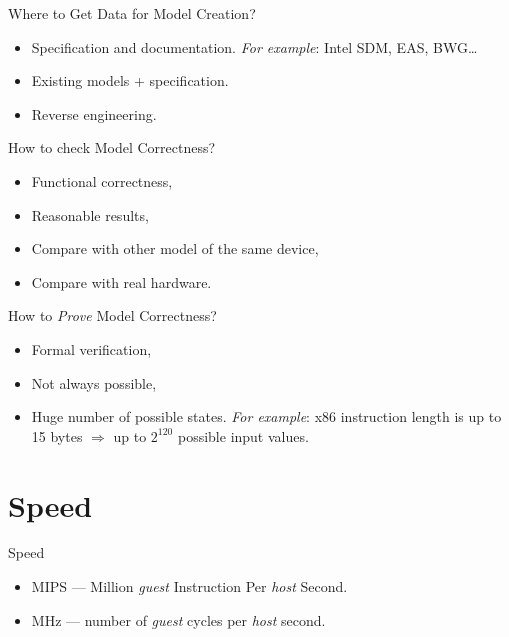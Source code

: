 \begin{frame}{Where to Get Data for Model Creation?}
\begin{itemize}
\item Specification and documentation. \textit{For example}: Intel SDM, EAS, BWG\dots
\item Existing models + specification.
\item Reverse engineering.
\end{itemize}
\end{frame}

\begin{frame}{How to check Model Correctness?}
\begin{itemize}
\item Functional correctness,
\item Reasonable results,
\item Compare with other model of the same device,
\item Compare with real hardware.
\end{itemize}
\end{frame}

\begin{frame}{How to \textit{Prove} Model Correctness?}
\begin{itemize}
\item Formal verification,
\item Not always possible,
\item Huge number of possible states. \textit{For example}: x86 instruction
  length is up to 15 bytes $\Rightarrow$ up to $2^{120}$  possible input values.
\end{itemize}
\end{frame}

\section{Speed}

\begin{frame}{Speed}
\begin{itemize}
\item MIPS --- Million \textit{guest} Instruction Per \textit{host} Second.
\item MHz --- number of \textit{guest} cycles per \textit{host} second.
\end{itemize}
\end{frame}

